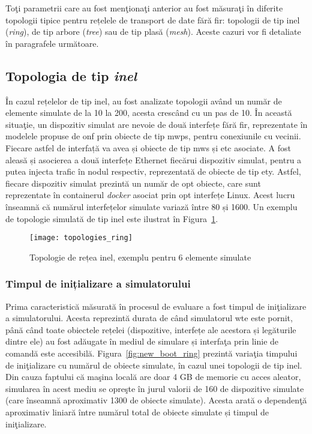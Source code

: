 Toţi parametrii care au fost menţionaţi anterior au fost măsuraţi în diferite topologii tipice pentru rețelele de transport de date fără fir: topologii de tip inel (\textit{ring}), de tip arbore (\textit{tree}) sau de tip plasă (\textit{mesh}). Aceste cazuri vor fi detaliate în paragrafele următoare.

\subsection{Topologia de tip \textit{inel}}

În cazul rețelelor de tip inel, au fost analizate topologii având un număr de elemente simulate de la 10 la 200, acesta crescând cu un pas de 10. În această situaţie, un dispozitiv simulat are nevoie de două interfețe fără fir, reprezentate în modelele propuse de \gls{onf} prin obiecte de tip \gls{mwps}, pentru conexiunile cu vecinii. Fiecare astfel de interfață va avea și obiecte de tip \gls{mws} și \gls{etc} asociate. A fost aleasă și asocierea a două interfețe Ethernet fiecărui dispozitiv simulat, pentru a putea injecta trafic în nodul respectiv, reprezentată de obiecte de tip \gls{ety}. Astfel, fiecare dispozitiv simulat prezintă un număr de opt obiecte, care sunt reprezentate în containerul \textit{docker} asociat prin opt interfețe Linux. Acest lucru înseamnă că numărul interfețelor simulate variază între 80 și 1600. Un exemplu de topologie simulată de tip inel este ilustrat în Figura~\ref{fig:topologies_ring}.

\begin{figure}[h]
	\centering
	\texttt{[image: topologies\_ring]}
	\caption{Topologie de rețea inel, exemplu pentru 6 elemente simulate}
	\label{fig:topologies_ring}
\end{figure}

\subsubsection{Timpul de inițializare a simulatorului}

Prima caracteristică măsurată în procesul de evaluare a fost timpul de iniţializare a simulatorului. Acesta reprezintă durata de când simulatorul \gls{wte} este pornit, până când toate obiectele rețelei (dispozitive, interfețe ale acestora și legăturile dintre ele) au fost adăugate în mediul de simulare și interfaţa prin linie de comandă este accesibilă. Figura~\ref{fig:new_boot_ring} prezintă variaţia timpului de iniţializare cu numărul de obiecte simulate, în cazul unei topologii de tip inel. Din cauza faptului că maşina locală are doar 4 GB de memorie cu acces aleator, simularea în acest mediu se opreşte în jurul valorii de 160 de dispozitive simulate (care înseamnă aproximativ 1300 de obiecte simulate). Acesta arată o dependenţă aproximativ liniară între numărul total de obiecte simulate și timpul de iniţializare. 

